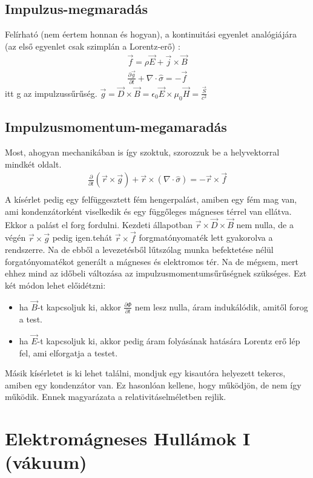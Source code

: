 \documentclass{article}
\begin{document}
\subsection{Impulzus-megmaradás}
Felírható (nem éertem honnan és hogyan), a kontinuitási egyenlet analógiájára (az első egyenlet csak szimplán a Lorentz-erő) :
\begin{gather*}
\vec{f} = \rho \vec{E} + \vec{j} \times \vec{B} \\
\frac{\partial \vec{g}}{\partial t} + \nabla \cdot \hat{\sigma} = -\vec{f}
\end{gather*}
itt g az impulzussűrűség. $\vec{g} = \vec{D} \times \vec{B} = \epsilon_0 \vec{E} \times \mu_0 \vec{H} = \frac{\vec{S}}{c^2}$
\subsection{Impulzusmomentum-megamaradás}
Most, ahogyan mechanikában is így szoktuk, szorozzuk be a helyvektorral mindkét oldalt. 
\begin{gather*}
\frac{\partial}{\partial t} (\vec{r} \times \vec{g}) + \vec{r} \times (\nabla \cdot \hat{\sigma}) = -\vec{r} \times \vec{f} \\
\end{gather*}
A kísérlet pedig egy felfüggesztett fém hengerpalást, amiben egy fém mag van, ami kondenzátorként viselkedik és egy függőleges mágneses térrel van ellátva. Ekkor a palást el forg fordulni. Kezdeti állapotban $\vec{r} \times \vec {D} \times \vec{B}$ nem nulla, de a végén $\vec{r} \times \vec{g} $ pedig igen.tehát $\vec{r} \times \vec{f}$ forgmatónyomaték lett gyakorolva a rendszerre. Na de ebből a levezetésből lűtszólag munka befektetése nélül forgatónyomatékot generált a mágneses és elektromos tér. Na de mégsem, mert ehhez mind az időbeli változása az impulzusmomentumsűrűségnek szükséges. Ezt két módon lehet előidétzni:
\begin{itemize}
\item ha $\vec{B}$-t kapcsoljuk ki, akkor $\frac{\partial \Phi}{\partial t}$ nem lesz nulla, áram indukálódik, amitől forog a test.
\item ha $\vec{E}$-t kapcsoljuk ki, akkor pedig áram folyásának hatására Lorentz erő lép fel, ami elforgatja a testet.
\end{itemize}
Másik kísérletet is ki lehet találni, mondjuk egy kisautóra helyezett tekercs, amiben egy kondenzátor van. Ez hasonlóan kellene, hogy működjön, de nem így működik. Ennek magyarázata a relativitáselméletben rejlik.
\newpage
\section{Elektromágneses Hullámok I (vákuum)}
\end{document}
